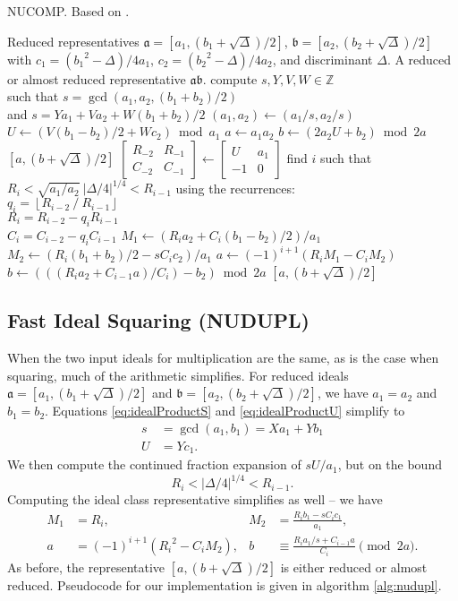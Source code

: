 \documentclass{ucalgthes1}
\theoremstyle{definition}
\newcommand{\ZZ}{\mathbb{Z}}
\newcommand{\matrixtt}[4]{\left[ \begin{array}{rr} #1 & #2 \\ #3 & #4 \end{array} \right]}
\newcommand{\floor}[1]{\left\lfloor #1 \right\rfloor}
\begin{document}
\begin{algorithm}[h]
\caption{NUCOMP. Based on \cite[pp.441-443]{Jacobson2009}.}
\label{alg:nucomp}
\begin{algorithmic}[1]
\REQUIRE Reduced representatives $\mathfrak a = [a_1, (b_1+\sqrt\Delta)/2]$, $\mathfrak b = [a_2, (b_2+\sqrt\Delta)/2]$ with \break $c_1 = ({b_1}^2-\Delta)/4a_1$, $c_2 = ({b_2}^2-\Delta)/4a_2$, and discriminant $\Delta$.
\ENSURE A reduced or almost reduced representative $\mathfrak a \mathfrak b$.
\STATE compute $s, Y, V, W \in \ZZ$ \\
       such that $s = \gcd(a_1, a_2, (b_1+b_2)/2)$ \\
       and $s = Ya_1 + Va_2 + W (b_1+b_2)/2$
\STATE $(a_1, a_2) \gets (a_1/s, a_2/s)$
\STATE $U \gets (V(b_1-b_2)/2 + Wc_2) \bmod{a_1}$
	\STATE $a \gets a_1a_2$
	\STATE $b \gets (2a_2U + b_2) \bmod{2a}$
	\RETURN $[a, (b+\sqrt\Delta)/2]$
\ENDIF
\STATE $\matrixtt{R_{-2}}{R_{-1}}{C_{-2}}{C_{-1}} \gets \matrixtt{U}{a_1}{-1}{0}$
\STATE find $i$ such that $R_i < \sqrt{a_1/a_2} ~ |\Delta/4|^{1/4} < R_{i-1}$ using the recurrences: \\
$q_i = \floor{R_{i-2} ~/~ R_{i-1}}$ \\
$R_i = R_{i-2}-q_i R_{i-1}$ \\
$C_i=C_{i-2}-q_i C_{i-1}$
\STATE $M_1 \gets (R_i a_2 + C_i(b_1-b_2)/2)/a_1$
\STATE $M_2 \gets (R_i (b_1+b_2)/2 -sC_i c_2)/a_1$
\STATE $a \gets (-1)^{i+1}(R_i M_1 - C_i M_2)$
\STATE $b \gets (((R_i a_2 + C_{i-1} a)/C_i) - b_2) \bmod{2a}$
\RETURN $[a, (b+\sqrt\Delta)/2]$
\end{algorithmic}
\end{algorithm}


\subsection{Fast Ideal Squaring (NUDUPL)}\label{subsec:nudupl}

When the two input ideals for multiplication are the same, as is the case when squaring, much of the arithmetic simplifies.  For reduced ideals $\mathfrak a = [a_1, (b_1 + \sqrt\Delta)/2]$ and $\mathfrak b = [a_2, (b_2 + \sqrt\Delta)/2]$, we have $a_1=a_2$ and $b_1=b_2$.  Equations \ref{eq:idealProductS} and \ref{eq:idealProductU} simplify to
\begin{align*}
	s &= \gcd(a_1, b_1) = Xa_1 + Yb_1 \\
	U &= Yc_1.
\end{align*}
We then compute the continued fraction expansion of $sU/a_1$, but on the bound
\[
	R_i < |\Delta/4|^{1/4} < R_{i-1}.
\]
Computing the ideal class representative simplifies as well -- we have
\begin{align*}
	M_1 &= R_i, & 
	M_2 &= \frac{R_i b_1 - sC_i c_1}{a_1}, \\
	a &= (-1)^{i+1}({R_i}^2 - C_i M_2), &
	b &\equiv \frac{R_i a_1/s  + C_{i-1} a}{C_i} \pmod{2a}.
\end{align*}
As before, the representative $[a, (b+\sqrt\Delta)/2]$ is either reduced or almost reduced.  \break Pseudocode for our implementation is given in algorithm \ref{alg:nudupl}.
\end{document}
